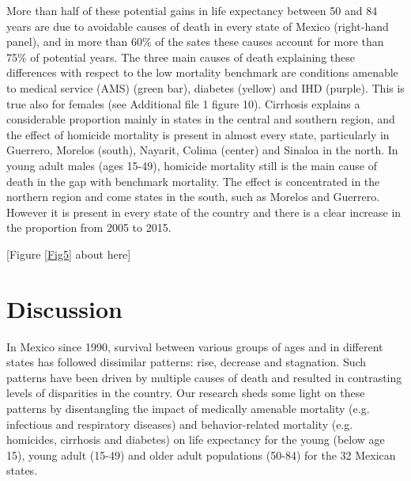 \documentclass{bmcart}
\begin{document}
More than half of these potential gains in life expectancy between 50 and 84 years are due to avoidable causes of death in every state of Mexico (right-hand panel), and in more than 60\% of the sates these causes account for more than 75\% of potential years. The three main causes of death explaining these differences with respect to the low mortality benchmark are conditions amenable to medical service (AMS) (green bar), diabetes (yellow) and IHD (purple). This is true also for females (see Additional file 1 figure 10). Cirrhosis explains a considerable proportion mainly in states in the central and southern region, and the effect of homicide mortality is present in almost every state, particularly in Guerrero, Morelos (south), Nayarit, Colima (center) and Sinaloa in the north. In young adult males (ages 15-49), homicide mortality still is the main cause of death in the gap with benchmark mortality. The effect is concentrated in the northern region and come states in the south, such as Morelos and Guerrero. However it is present in every state of the country and there is a clear increase in the proportion from 2005 to 2015.

\begin{center}
[Figure \ref{Fig5} about here]
\end{center}



\section*{Discussion}
In Mexico since 1990, survival between various groups of ages and in different states has followed dissimilar patterns: rise, decrease and stagnation. Such patterns have been driven by multiple causes of death and resulted in contrasting levels of disparities in the country. Our research sheds some light on these patterns by disentangling the impact of medically amenable mortality (e.g. infectious and respiratory diseases) and behavior-related mortality (e.g. homicides, cirrhosis and diabetes) on life expectancy for the young (below age 15), young adult (15-49) and older adult populations (50-84) for the 32 Mexican states.
\end{document}
